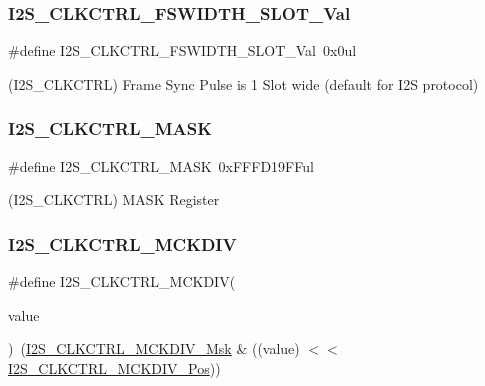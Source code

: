 \subsubsection{\texorpdfstring{I2S\_CLKCTRL\_FSWIDTH\_SLOT\_Val}{I2S\_CLKCTRL\_FSWIDTH\_SLOT\_Val}}
{\footnotesize\ttfamily \#define I2\+S\+\_\+\+C\+L\+K\+C\+T\+R\+L\+\_\+\+F\+S\+W\+I\+D\+T\+H\+\_\+\+S\+L\+O\+T\+\_\+\+Val~0x0ul}



(I2\+S\+\_\+\+C\+L\+K\+C\+T\+RL) Frame Sync Pulse is 1 Slot wide (default for I2S protocol) 

\mbox{\label{group___s_a_m_d21___i2_s_ga8226b438dcf86a1ccb34b1a34ee20851}} 
\subsubsection{\texorpdfstring{I2S\_CLKCTRL\_MASK}{I2S\_CLKCTRL\_MASK}}
{\footnotesize\ttfamily \#define I2\+S\+\_\+\+C\+L\+K\+C\+T\+R\+L\+\_\+\+M\+A\+SK~0x\+F\+F\+F\+D19\+F\+Ful}



(I2\+S\+\_\+\+C\+L\+K\+C\+T\+RL) M\+A\+SK Register 

\mbox{\label{group___s_a_m_d21___i2_s_gaf19164a5f5aa7e0d145186931712dddd}} 
\subsubsection{\texorpdfstring{I2S\_CLKCTRL\_MCKDIV}{I2S\_CLKCTRL\_MCKDIV}}
{\footnotesize\ttfamily \#define I2\+S\+\_\+\+C\+L\+K\+C\+T\+R\+L\+\_\+\+M\+C\+K\+D\+IV(\begin{DoxyParamCaption}\item[{}]{value }\end{DoxyParamCaption})~(\mbox{\hyperlink{group___s_a_m_d21___i2_s_ga41ca3ed01a8f63d3bfc985235f71514f}{I2\+S\+\_\+\+C\+L\+K\+C\+T\+R\+L\+\_\+\+M\+C\+K\+D\+I\+V\+\_\+\+Msk}} \& ((value) $<$$<$ \mbox{\hyperlink{group___s_a_m_d21___i2_s_gad3726a482440530335068151b6dc027d}{I2\+S\+\_\+\+C\+L\+K\+C\+T\+R\+L\+\_\+\+M\+C\+K\+D\+I\+V\+\_\+\+Pos}}))}

